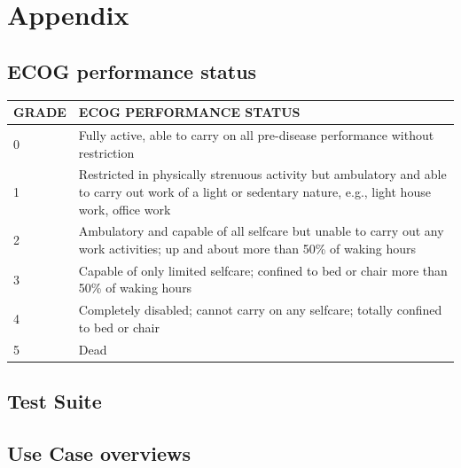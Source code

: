 
\section{Appendix}

\subsection{ECOG performance status}


\begin{tabular}{|l p{8cm}|}
\hline
GRADE&	ECOG PERFORMANCE STATUS\\
\hline\hline
0	&Fully active, able to carry on all pre-disease performance without restriction\\
1	&Restricted in physically strenuous activity but ambulatory and able to carry out work of a light or sedentary nature, e.g., light house work, office work\\
2	&Ambulatory and capable of all selfcare but unable to carry out any work activities; up and about more than 50\% of waking hours\\
3	&Capable of only limited selfcare; confined to bed or chair more than 50\% of waking hours\\
4	&Completely disabled; cannot carry on any selfcare; totally confined to bed or chair\\
5	&Dead\\
\hline
\end{tabular}
\label{tab:ecog}

\subsection{Test Suite}
\label{sub:test_suit}


\subsection{Use Case overviews}

